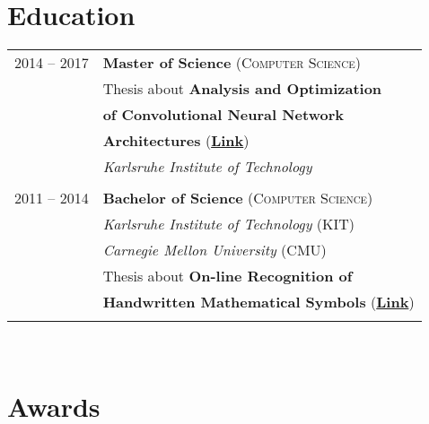 \documentclass[a4paper,10pt]{article} %
\begin{document}
{\begin{minipage}[t]{0.44\textwidth}
\section{Education}

\begin{tabular}{rl} %


2014 -- 2017 & \textbf{Master of Science} (\textsc{Computer Science})\\
& Thesis about {\textbf{\color{headings}Analysis and Optimization}}\\
& {\textbf{\color{headings}of Convolutional Neural Network}}\\
& {\textbf{\color{headings}Architectures}} (\textbf{\href{https://arxiv.org/abs/1707.09725}{Link}})\\
& \textit{Karlsruhe Institute of Technology}\\
&\\


2011 -- 2014 & \textbf{Bachelor of Science} (\textsc{Computer Science})\\
& \textit{Karlsruhe Institute of Technology} (KIT)\\
& \textit{Carnegie Mellon University} (CMU)\\
& Thesis about {\textbf{\color{headings}On-line Recognition of}}\\
& {\textbf{\color{headings}Handwritten Mathematical Symbols}} (\textbf{\href{http://martin-thoma.com/write-math/}{Link}})\\
&\\


\end{tabular}\\[10pt]


\section{Awards}


\end{minipage}}
\end{document}

